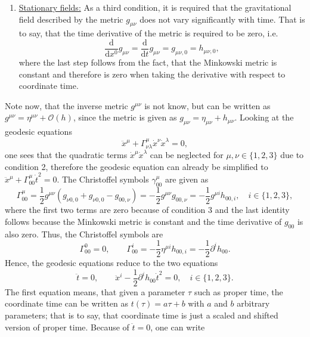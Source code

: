\documentclass[a4paper,11pt]{article}
\numberwithin{equation}{section}
\begin{document}
{\begin{enumerate}
\item \underline{Stationary fields:} As a third condition, it is required that the gravitational field described by the metric $g_{\mu\nu}$ does not vary significantly with time. That is to say, that the time derivative of the metric is required to be zero, i.e. \begin{equation}
\frac{\mathrm{d}}{\mathrm{d}x^0}g_{\mu\nu} = \frac{\mathrm{d}}{\mathrm{d}t}g_{\mu\nu} = g_{\mu\nu,0} = h_{\mu\nu,0},
\end{equation} where the last step follows from the fact, that the Minkowski metric is constant and therefore is zero when taking the derivative with respect to coordinate time.
\end{enumerate}

Note now, that the inverse metric $g^{\mu\nu}$ is not know, but can be written as $g^{\mu\nu} = \eta^{\mu\nu} + \mathcal{O}(h)$, since the metric is given as $g_{\mu\nu} = \eta_{\mu\nu} + h_{\mu\nu}$. Looking at the geodesic equations \begin{equation}\ddot{x}^\mu + \Gamma^\mu_{\nu\lambda}\dot{x}^\nu\dot{x}^\lambda = 0,
\end{equation} one sees that the quadratic terms $\dot{x}^\mu\dot{x}^\lambda$ can be neglected for $\mu,\nu\in\{1,2,3\}$ due to condition 2, therefore the geodesic equation can already be simplified to $\ddot{x}^\mu + \Gamma^\mu_{00}\dot{t}^2 = 0$. The Christoffel symbols $\gamma^\mu_{00}$ are given as \begin{equation}
\Gamma^\mu_{00} = \frac{1}{2}g^{\mu\nu}(g_{\nu 0,0}+g_{\nu 0, 0} - g_{00,\nu}) = -\frac{1}{2}g^{\mu\nu}g_{00,\nu} = -\frac{1}{2}g^{\mu i}h_{00,i}, \quad i \in \{1,2,3\},
\end{equation} where the first two terms are zero because of condition 3 and the last identity follows because the Minkowski metric is constant and the time derivative of $g_{00}$ is also zero. Thus, the Christoffel symbols are \begin{equation}
\Gamma^0_{00} = 0, \qquad \Gamma^i_{00} = -\frac{1}{2}\eta^{\mu i}h_{00,i} = -\frac{1}{2}\partial^i h_{00}.
\end{equation} Hence, the geodesic equations reduce to the two equations 
\begin{equation}
\ddot{t} = 0, \qquad \ddot{x}^i - \frac{1}{2}\partial^i h_{00}\dot{t}^2 = 0, \quad i \in \{1,2,3\}.
\end{equation} The first equation means, that given a parameter $\tau$ such as proper time, the coordinate time can be written as $t(\tau) = a\tau + b$ with $a$ and $b$ arbitrary parameters; that is to say, that coordinate time is just a scaled and shifted version of proper time. Because of $\ddot{t} = 0$, one can write \begin{equation}

\end{equation}}
\end{document}
